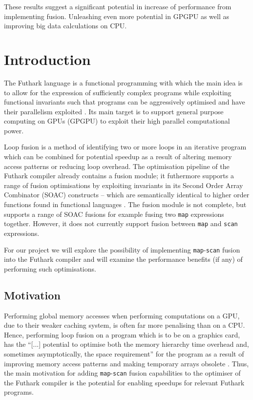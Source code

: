 \documentclass[11pt,bibliography=totocnumbered]{article}
\begin{document}
These results suggest a significant potential in increase of performance from implementing fusion. Unleashing even more potential in GPGPU as well as improving big data calculations on CPU.
\section{Introduction}

The Futhark language is a functional programming with which the main idea is to allow for the expression of sufficiently complex programs while exploiting functional invariants such that
 programs can be aggressively optimised and have their parallelism exploited \cite{futharkdoc}. Its main target is to support general purpose computing on GPUs (GPGPU) to exploit their high parallel
 computational power.

Loop fusion is a method of identifying two or more loops in an iterative program which can be combined for potential speedup as a result of altering memory access patterns  or reducing loop overhead.
 The optimisation pipeline of the Futhark compiler already contains a fusion module; it futhermore supports a range of fusion optimisations by exploiting invariants in its Second Order Array Combinator (SOAC) constructs -- which are semantically identical
 to higher order functions found in functional languages \cite{T2Fusion}. The fusion module is not complete, but supports a range of SOAC fusions for example fusing two \texttt{map} expressions together. However, it does not currently support fusion between \texttt{map} and \texttt{scan} expressions.

For our project we will explore the possibility of implementing \texttt{map}-\texttt{scan} fusion into the Futhark compiler and will examine the performance benefits (if any) of performing such optimisations.

\subsection{Motivation}
Performing global memory accesses when performing computations on a GPU, due to their weaker caching system, is often far more penalising than on a CPU. Hence, performing loop fusion on a program
 which is to be on a graphics card, has the ``[...] potential to optimise both the memory hierarchy time overhead and, sometimes asymptotically, the space requirement'' \cite[p. 1]{T2Fusion} for the program as a result of 
improving memory access patterns and making temporary arrays obsolete \cite{T2Fusion}.
 Thus, the main motivation for adding \texttt{map}-\texttt{scan} fusion capabilities to
 the optimiser of the Futhark compiler is the potential for enabling speedups for relevant Futhark programs.
\end{document}
